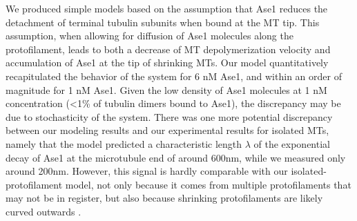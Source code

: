 We produced simple models based on the assumption that Ase1 reduces the detachment of terminal tubulin subunits when bound at the MT tip. This assumption, when allowing for diffusion of Ase1 molecules along the protofilament, leads to both a decrease of MT depolymerization velocity and accumulation of Ase1 at the tip of shrinking MTs. Our model quantitatively recapitulated the behavior of the system for 6 nM Ase1, and within an order of magnitude for 1 nM Ase1. Given the low density of Ase1 molecules at 1 nM concentration (<1\% of tubulin dimers bound to Ase1), the discrepancy may be due to stochasticity of the system. There was one more potential discrepancy between our modeling results and our experimental results for isolated MTs, namely that the model predicted a characteristic length $\lambda$ of the exponential decay of Ase1 at the microtubule end of around 600nm, while we measured only around 200nm. However, this signal is hardly comparable with our isolated-protofilament model, not only because it comes from multiple protofilaments that may not be in register, but also because shrinking protofilaments are likely curved outwards \parencite{McIntosh2008}. \par


